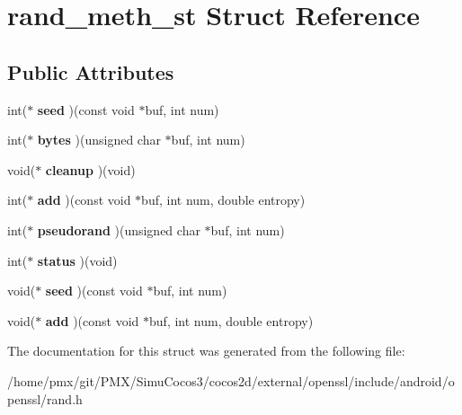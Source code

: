 \hypertarget{structrand__meth__st}{}\section{rand\+\_\+meth\+\_\+st Struct Reference}
\label{structrand__meth__st}
\subsection*{Public Attributes}
\begin{DoxyCompactItemize}
\item 
\mbox{\label{structrand__meth__st_a0c07434116740679d74ea09039c57048}} 
int($\ast$ {\bfseries seed} )(const void $\ast$buf, int num)
\item 
\mbox{\label{structrand__meth__st_a51f806eb7c17d537acc3c60eb094b5e7}} 
int($\ast$ {\bfseries bytes} )(unsigned char $\ast$buf, int num)
\item 
\mbox{\label{structrand__meth__st_a6a58a65a9fc82076c67de09e69208249}} 
void($\ast$ {\bfseries cleanup} )(void)
\item 
\mbox{\label{structrand__meth__st_a9266d7254f9bd15c848fed0fbd4e1161}} 
int($\ast$ {\bfseries add} )(const void $\ast$buf, int num, double entropy)
\item 
\mbox{\label{structrand__meth__st_aa49a157dccd9b64d955cf1de463f0a73}} 
int($\ast$ {\bfseries pseudorand} )(unsigned char $\ast$buf, int num)
\item 
\mbox{\label{structrand__meth__st_ad186b8bf95a81420cd4949e7675bc9f4}} 
int($\ast$ {\bfseries status} )(void)
\item 
\mbox{\label{structrand__meth__st_ac5982cb0ac2304a601df7fb009624ec9}} 
void($\ast$ {\bfseries seed} )(const void $\ast$buf, int num)
\item 
\mbox{\label{structrand__meth__st_a5587c9d9c28a2abf0136fcc499028f5b}} 
void($\ast$ {\bfseries add} )(const void $\ast$buf, int num, double entropy)
\end{DoxyCompactItemize}


The documentation for this struct was generated from the following file\+:\begin{DoxyCompactItemize}
\item 
/home/pmx/git/\+P\+M\+X/\+Simu\+Cocos3/cocos2d/external/openssl/include/android/openssl/rand.\+h\end{DoxyCompactItemize}
